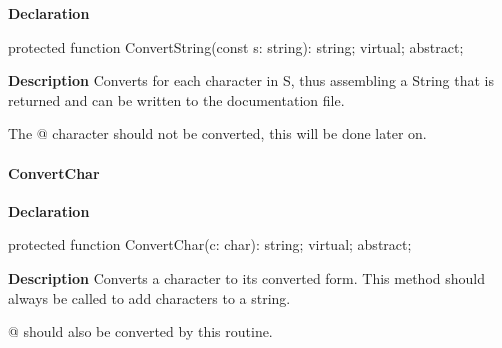 \documentclass{report}
\newif\ifpdf
\begin{document}
\label{PasDoc_Gen.TDocGenerator-ConvertString}
\begin{list}{}{
\setlength{\itemindent}{0cm}
\setlength{\listparindent}{0cm}
\setlength{\leftmargin}{\evensidemargin}
\addtolength{\leftmargin}{\tmplength}
\settowidth{\labelsep}{X}
\addtolength{\leftmargin}{\labelsep}
\setlength{\labelwidth}{\tmplength}
}
\item[\textbf{Declaration}\hfill]
\ifpdf
\begin{flushleft}
\fi
\begin{ttfamily}
protected function ConvertString(const s: string): string; virtual; abstract;\end{ttfamily}

\ifpdf
\end{flushleft}
\fi

\par
\item[\textbf{Description}]
Converts for each character in S, thus assembling a String that is returned and can be written to the documentation file.

The @ character should not be converted, this will be done later on.

\end{list}
\paragraph*{ConvertChar}\hspace*{\fill}

\label{PasDoc_Gen.TDocGenerator-ConvertChar}
\begin{list}{}{
\setlength{\itemindent}{0cm}
\setlength{\listparindent}{0cm}
\setlength{\leftmargin}{\evensidemargin}
\addtolength{\leftmargin}{\tmplength}
\settowidth{\labelsep}{X}
\addtolength{\leftmargin}{\labelsep}
\setlength{\labelwidth}{\tmplength}
}
\item[\textbf{Declaration}\hfill]
\ifpdf
\begin{flushleft}
\fi
\begin{ttfamily}
protected function ConvertChar(c: char): string; virtual; abstract;\end{ttfamily}

\ifpdf
\end{flushleft}
\fi

\par
\item[\textbf{Description}]
Converts a character to its converted form. This method should always be called to add characters to a string.

@ should also be converted by this routine.

\end{list}
\end{document}
